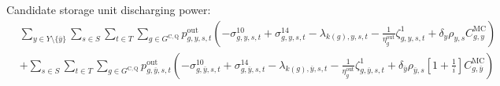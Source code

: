 \documentclass{article}
\newcommand{\sStorageCandidate}{G^{\mathrm{C,Q}}}
\newcommand{\sYears}{Y}
\newcommand{\sScenarios}{S}
\newcommand{\sIntervals}{T}
\newcommand{\iGenerator}{g}
\newcommand{\iYear}{y}
\newcommand{\iYearTerminal}{\overline{\iYear}}
\newcommand{\iScenario}{s}
\newcommand{\iInterval}{t}
\newcommand{\iIntervalTerminal}{\overline{\iInterval}}
\newcommand{\iZone}{z}
\newcommand{\cScenarioDuration}[1][\iYear,\iScenario]{\rho_{#1}}
\newcommand{\cMarginalCost}[1][\iGenerator,\iYear]{C^{\mathrm{MC}}_{#1}}
\newcommand{\cInterestRate}{i}
\newcommand{\cStorageUnitEfficiencyDischarging}{\eta_{\iGenerator}^{\mathrm{out}}}
\newcommand{\cDiscountRate}[1][\iYear]{\delta_{#1}}
\newcommand{\vPowerOut}[1][\iGenerator,\iYear,\iScenario,\iInterval]{p^{\mathrm{out}}_{#1}}
\newcommand{\dNonNegativeDischarging}[1][\iGenerator,\iYear,\iScenario,\iInterval]{\sigma_{#1}^{10}}
\newcommand{\dMaxDischargingRateCandidate}[1][\iGenerator,\iYear,\iScenario,\iInterval]{\sigma_{#1}^{14}}
\newcommand{\dRampRateUpStorageDischarging}[1][\iGenerator,\iYear,\iScenario,\iInterval]{\sigma_{#1}^{22}}
\newcommand{\dRampRateDownStorageDischarging}[1][\iGenerator,\iYear,\iScenario,\iInterval]{\sigma_{#1}^{25}}
\newcommand{\dPowerBalance}[1][\iZone,\iYear,\iScenario,\iInterval]{\lambda_{#1}}
\newcommand{\dStorageEnergyTransition}[1][\iGenerator,\iYear,\iScenario,\iInterval]{\zeta_{#1}^{1}}
\newcommand{\dStorageEnergyOutput}[1][\iGenerator,\iYear,\iScenario,\iInterval]{\zeta_{#1}^{3}}
\begin{document}
Candidate storage unit discharging power:
\begin{align}
	& \sum\limits_{\iYear \in \sYears \setminus \{\iYearTerminal\}}\sum\limits_{\iScenario \in \sScenarios} \sum\limits_{\iInterval \in \sIntervals 
	} \sum\limits_{\iGenerator \in \sStorageCandidate} \vPowerOut \left( - \dNonNegativeDischarging + \dMaxDischargingRateCandidate - \dPowerBalance[k(\iGenerator),\iYear,\iScenario,\iInterval] - \frac{1}{\cStorageUnitEfficiencyDischarging} \dStorageEnergyTransition + \cDiscountRate \cScenarioDuration \cMarginalCost \right) \nonumber \\ 
	& + \sum\limits_{\iScenario \in \sScenarios}\sum\limits_{\iInterval \in \sIntervals 
} \sum\limits_{\iGenerator \in \sStorageCandidate} \vPowerOut[\iGenerator,\iYearTerminal,\iScenario,\iInterval] \left( - \dNonNegativeDischarging[\iGenerator,\iYearTerminal,\iScenario,\iInterval] + \dMaxDischargingRateCandidate[\iGenerator,\iYearTerminal,\iScenario,\iInterval] - \dPowerBalance[k(\iGenerator),\iYearTerminal,\iScenario,\iInterval] - \frac{1}{\cStorageUnitEfficiencyDischarging} \dStorageEnergyTransition[\iGenerator,\iYearTerminal,\iScenario,\iInterval] + \cDiscountRate[\iYearTerminal] \cScenarioDuration[\iYearTerminal,\iScenario] \left[1 + \frac{1}{\cInterestRate}\right] \cMarginalCost[\iGenerator,\iYearTerminal] \right) \nonumber\\
\end{align}
\end{document}
